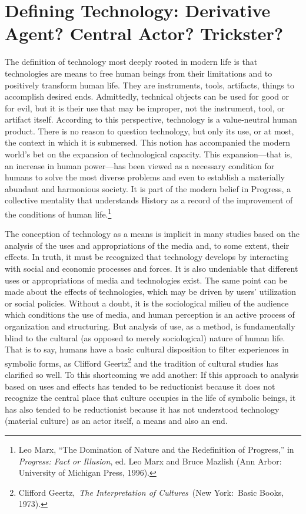 \documentclass{tufte-handout}
\begin{document}
\hypertarget{defining-technology-derivative-agent-central-actor-trickster}{%
\section{Defining Technology: Derivative Agent? Central Actor?
Trickster?}\label{defining-technology-derivative-agent-central-actor-trickster}}


The definition of technology most deeply rooted in modern life is that
technologies are means to free human beings from their limitations and
to positively transform human life. They are instruments, tools,
artifacts, things to accomplish desired ends. Admittedly, technical
objects can be used for good or for evil, but it is their use that may
be improper, not the instrument, tool, or artifact itself. According to
this perspective, technology is a value-neutral human product. There is
no reason to question technology, but only its use, or at most, the
context in which it is submersed. This notion has accompanied the modern
world's bet on the expansion of technological capacity. This
expansion---that is, an increase in human power---has been viewed as a
necessary condition for humans to solve the most diverse problems and
even to establish a materially abundant and harmonious society. It is
part of the modern belief in Progress, a \newpage
\noindent collective mentality that
understands History as a record of the improvement of the conditions of
human life.\footnote{Leo Marx, ``The Domination of Nature and the Redefinition of
  Progress,'' in \emph{Progress: Fact or Illusion}, ed. Leo Marx and
  Bruce Mazlish (Ann Arbor: University of Michigan Press, 1996).
}

The conception of technology as a means is implicit in many studies
based on the analysis of the uses and appropriations of the media and,
to some extent, their effects. In truth, it must be recognized that
technology develops by interacting with social and economic processes
and forces. It is also undeniable that different uses or appropriations
of media and technologies exist. The same point can be made about the
effects of technologies, which may be driven by users' utilization or
social policies. Without a doubt, it is the sociological milieu of the
audience which conditions the use of media, and human perception is an
active process of organization and structuring. But analysis of use, as
a method, is fundamentally blind to the cultural (as opposed to merely
sociological) nature of human life. That is to say, humans have a basic
cultural disposition to filter experiences in symbolic forms, as
Clifford Geertz\footnote{Clifford Geertz,~\emph{The Interpretation of Cultures}~(New
  York:~Basic Books, 1973).
} and the tradition
of cultural studies has clarified so well. To this shortcoming we add
another: If this approach to analysis based on uses and effects has
tended to be reductionist because it does not recognize the central
place that culture occupies in the life of symbolic beings, it has also
tended to be reductionist because it has not understood technology
(material culture) as an actor itself, a means and also an end.
\end{document}
